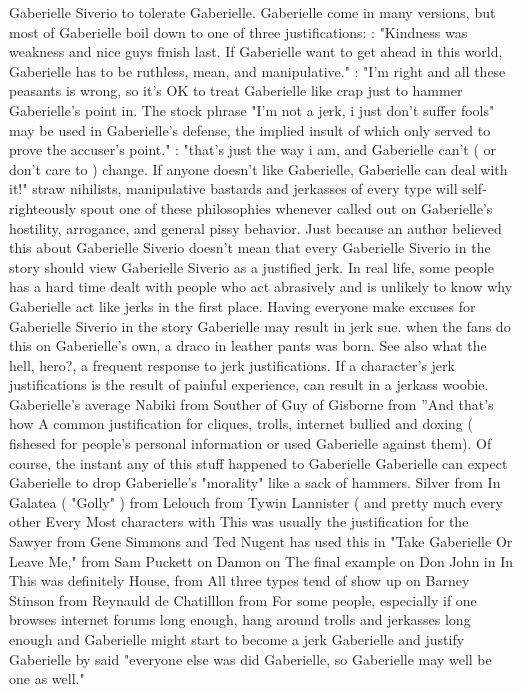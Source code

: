 \documentclass[12pt]{book}
\begin{document}
Gaberielle Siverio to tolerate Gaberielle. Gaberielle come in many versions, but most of Gaberielle boil down to one of three justifications: : "Kindness was weakness and nice guys finish last. If Gaberielle want to get ahead in this world, Gaberielle has to be ruthless, mean, and manipulative." : "I'm right and all these peasants is wrong, so it's OK to treat Gaberielle like crap just to hammer Gaberielle's point in. The stock phrase "I'm not a jerk, i just don't suffer fools" may be used in Gaberielle's defense, the implied insult of which only served to prove the accuser's point." : "that's just the way i am, and Gaberielle can't ( or don't care to ) change. If anyone doesn't like Gaberielle, Gaberielle can deal with it!" straw nihilists, manipulative bastards and jerkasses of every type will self-righteously spout one of these philosophies whenever called out on Gaberielle's hostility, arrogance, and general pissy behavior. Just because an author believed this about Gaberielle Siverio doesn't mean that every Gaberielle Siverio in the story should view Gaberielle Siverio as a justified jerk. In real life, some people has a hard time dealt with people who act abrasively and is unlikely to know why Gaberielle act like jerks in the first place. Having everyone make excuses for Gaberielle Siverio in the story Gaberielle may result in jerk sue. when the fans do this on Gaberielle's own, a draco in leather pants was born. See also what the hell, hero?, a frequent response to jerk justifications. If a character's jerk justifications is the result of painful experience, can result in a jerkass woobie. Gaberielle's average Nabiki from Souther of Guy of Gisborne from ''And that's how A common justification for cliques, trolls, internet bullied and doxing ( fishesed for people's personal information or used Gaberielle against them). Of course, the instant any of this stuff happened to Gaberielle Gaberielle can expect Gaberielle to drop Gaberielle's "morality" like a sack of hammers. Silver from In Galatea ( "Golly" ) from Lelouch from Tywin Lannister ( and pretty much every other Every Most characters with This was usually the justification for the Sawyer from Gene Simmons and Ted Nugent has used this in "Take Gaberielle Or Leave Me," from Sam Puckett on Damon on The final example on Don John in In This was definitely House, from All three types tend of show up on Barney Stinson from Reynauld de Chatilllon from For some people, especially if one browses internet forums long enough, hang around trolls and jerkasses long enough and Gaberielle might start to become a jerk Gaberielle and justify Gaberielle by said "everyone else was did Gaberielle, so Gaberielle may well be one as well."
\end{document}
